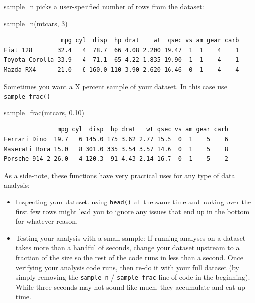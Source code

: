 \documentclass[
  letterpaper,
]{book}
\newenvironment{Shaded}{\begin{snugshade}}{\end{snugshade}}
\newcommand{\DecValTok}[1]{\textcolor[rgb]{0.68,0.00,0.00}{#1}}
\newcommand{\FloatTok}[1]{\textcolor[rgb]{0.68,0.00,0.00}{#1}}
\newcommand{\FunctionTok}[1]{\textcolor[rgb]{0.28,0.35,0.67}{#1}}
\newcommand{\NormalTok}[1]{\textcolor[rgb]{0.00,0.23,0.31}{#1}}
\providecommand{\tightlist}{%
  \setlength{\itemsep}{0pt}\setlength{\parskip}{0pt}}\usepackage{longtable,booktabs,array}
\theoremstyle{definition}
\theoremstyle{definition}
\theoremstyle{plain}
\theoremstyle{definition}
\theoremstyle{plain}
\theoremstyle{plain}
\theoremstyle{remark}
\begin{document}
sample\_n picks a user-specified number of rows from the dataset:

\begin{Shaded}
\begin{Highlighting}[]
\FunctionTok{sample\_n}\NormalTok{(mtcars, }\DecValTok{3}\NormalTok{)}
\end{Highlighting}
\end{Shaded}

\begin{verbatim}
                mpg cyl  disp  hp drat    wt  qsec vs am gear carb
Fiat 128       32.4   4  78.7  66 4.08 2.200 19.47  1  1    4    1
Toyota Corolla 33.9   4  71.1  65 4.22 1.835 19.90  1  1    4    1
Mazda RX4      21.0   6 160.0 110 3.90 2.620 16.46  0  1    4    4
\end{verbatim}

Sometimes you want a X percent sample of your dataset. In this case use
\texttt{sample\_frac()}

\begin{Shaded}
\begin{Highlighting}[]
\FunctionTok{sample\_frac}\NormalTok{(mtcars, }\FloatTok{0.10}\NormalTok{)}
\end{Highlighting}
\end{Shaded}

\begin{verbatim}
               mpg cyl  disp  hp drat   wt qsec vs am gear carb
Ferrari Dino  19.7   6 145.0 175 3.62 2.77 15.5  0  1    5    6
Maserati Bora 15.0   8 301.0 335 3.54 3.57 14.6  0  1    5    8
Porsche 914-2 26.0   4 120.3  91 4.43 2.14 16.7  0  1    5    2
\end{verbatim}

As a side-note, these functions have very practical uses for any type of
data analysis:

\begin{itemize}
\tightlist
\item
  Inspecting your dataset: using \texttt{head()} all the same time and
  looking over the first few rows might lead you to ignore any issues
  that end up in the bottom for whatever reason.
\item
  Testing your analysis with a small sample: If running analyses on a
  dataset takes more than a handful of seconds, change your dataset
  upstream to a fraction of the size so the rest of the code runs in
  less than a second. Once verifying your analysis code runs, then re-do
  it with your full dataset (by simply removing the \texttt{sample\_n} /
  \texttt{sample\_frac} line of code in the beginning). While three
  seconds may not sound like much, they accumulate and eat up time.
\end{itemize}
\end{document}
